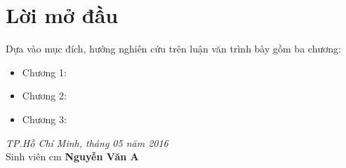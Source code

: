 \chapter*{Lời mở đầu}
\vspace{10pt}
\blindtext[4]
Dựa vào mục đích, hướng nghiên cứu trên luận văn trình bày gồm ba chương:
\begin{itemize}
\item  Chương 1: \dotfill 
\item  Chương 2: \dotfill 
\item  Chương 3: \dotfill 
\end{itemize}
\begin{flushright} 
	{\it TP.Hồ Chí Minh, tháng 05 năm 2016}	\\
	Sinh viên \hskip 2.5cm\quad	
	 cm	
	{\bf {Nguyễn Văn A} } \hspace*{1.8cm}  \quad
\end{flushright} 

